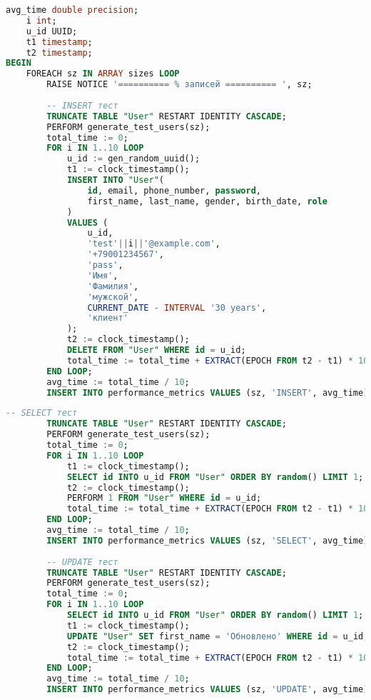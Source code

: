 \begin{lstlisting}[language=SQL,
	label=alg:perf_stud3y,
	caption={Исследование производительности операций \texttt{INSERT}, \texttt{SELECT}, \texttt{UPDATE} и \texttt{DELETE} на таблице \texttt{User} -- продолжение},
	captionpos=t,
	basicstyle=\ttfamily\small]
	avg_time double precision;
	i int;
	u_id UUID;
	t1 timestamp;
	t2 timestamp;
BEGIN
	FOREACH sz IN ARRAY sizes LOOP
		RAISE NOTICE '========== % записей ========== ', sz;
		
		-- INSERT тест
		TRUNCATE TABLE "User" RESTART IDENTITY CASCADE;
		PERFORM generate_test_users(sz);
		total_time := 0;
		FOR i IN 1..10 LOOP
			u_id := gen_random_uuid();
			t1 := clock_timestamp();
			INSERT INTO "User"(
				id, email, phone_number, password, 
				first_name, last_name, gender, birth_date, role
			)
			VALUES (
				u_id, 
				'test'||i||'@example.com', 
				'+79001234567', 
				'pass', 
				'Имя', 
				'Фамилия', 
				'мужской', 
				CURRENT_DATE - INTERVAL '30 years', 
				'клиент'
			);
			t2 := clock_timestamp();
			DELETE FROM "User" WHERE id = u_id;
			total_time := total_time + EXTRACT(EPOCH FROM t2 - t1) * 1000;
		END LOOP;
		avg_time := total_time / 10;
		INSERT INTO performance_metrics VALUES (sz, 'INSERT', avg_time);
\end{lstlisting}

\begin{lstlisting}[language=SQL,
	label=alg:perf_stud1y,
	caption={Исследование производительности операций \texttt{INSERT}, \texttt{SELECT}, \texttt{UPDATE} и \texttt{DELETE} на таблице \texttt{User} -- продолжение},
	captionpos=t,
	basicstyle=\ttfamily\small]
		-- SELECT тест
		TRUNCATE TABLE "User" RESTART IDENTITY CASCADE;
		PERFORM generate_test_users(sz);
		total_time := 0;
		FOR i IN 1..10 LOOP
			t1 := clock_timestamp();
			SELECT id INTO u_id FROM "User" ORDER BY random() LIMIT 1;
			t2 := clock_timestamp();
			PERFORM 1 FROM "User" WHERE id = u_id;
			total_time := total_time + EXTRACT(EPOCH FROM t2 - t1) * 1000;
		END LOOP;
		avg_time := total_time / 10;
		INSERT INTO performance_metrics VALUES (sz, 'SELECT', avg_time);
		
		-- UPDATE тест
		TRUNCATE TABLE "User" RESTART IDENTITY CASCADE;
		PERFORM generate_test_users(sz);
		total_time := 0;
		FOR i IN 1..10 LOOP
			SELECT id INTO u_id FROM "User" ORDER BY random() LIMIT 1;
			t1 := clock_timestamp();
			UPDATE "User" SET first_name = 'Обновлено' WHERE id = u_id;
			t2 := clock_timestamp();
			total_time := total_time + EXTRACT(EPOCH FROM t2 - t1) * 1000;
		END LOOP;
		avg_time := total_time / 10;
		INSERT INTO performance_metrics VALUES (sz, 'UPDATE', avg_time);
\end{lstlisting}

